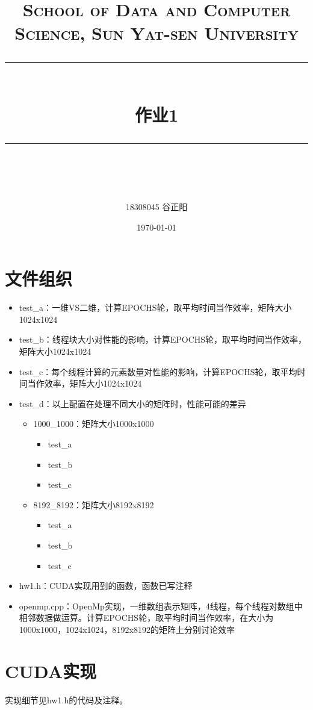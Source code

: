 \documentclass[UTF8, a4paper, 11pt]{article}
\title{	
\normalfont \normalsize
\textsc{School of Data and Computer Science, Sun Yat-sen University} \\ [25pt] %
\rule{\textwidth}{0.5pt} \\[0.4cm] %
\huge 作业1\\ %
\rule{\textwidth}{2pt} \\[0.5cm] %
\author{18308045 谷正阳}
\date{\normalsize\today}
}
\begin{document}
\maketitle
\tableofcontents
\newpage
\section{文件组织}
\begin{itemize}
    \item test\_a：一维VS二维，计算EPOCHS轮，取平均时间当作效率，矩阵大小1024x1024
    \item test\_b：线程块大小对性能的影响，计算EPOCHS轮，取平均时间当作效率，矩阵大小1024x1024
    \item test\_c：每个线程计算的元素数量对性能的影响，计算EPOCHS轮，取平均时间当作效率，矩阵大小1024x1024
    \item test\_d：以上配置在处理不同大小的矩阵时，性能可能的差异
    \begin{itemize}
        \item 1000\_1000：矩阵大小1000x1000
        \begin{itemize}
            \item test\_a
            \item test\_b
            \item test\_c
        \end{itemize}
        \item 8192\_8192：矩阵大小8192x8192
        \begin{itemize}
            \item test\_a
            \item test\_b
            \item test\_c
        \end{itemize}
    \end{itemize}
    \item hw1.h：CUDA实现用到的函数，函数已写注释
    \item openmp.cpp：OpenMp实现，一维数组表示矩阵，4线程，每个线程对数组中相邻数据做运算。计算EPOCHS轮，取平均时间当作效率，在大小为1000x1000，1024x1024，8192x8192的矩阵上分别讨论效率
\end{itemize}
\section{CUDA实现}
实现细节见hw1.h的代码及注释。
\end{document}

